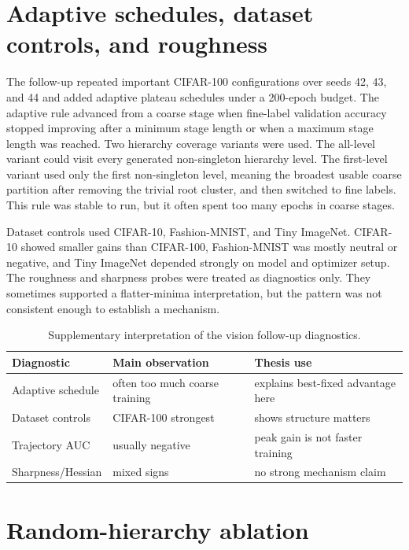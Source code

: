 \section{Adaptive schedules, dataset controls, and roughness}
\label{app:roughness-followup-curriculum}

The follow-up repeated important CIFAR-100 configurations over seeds 42, 43, and
44 and added adaptive plateau schedules under a 200-epoch budget. The adaptive
rule advanced from a coarse stage when fine-label validation accuracy stopped
improving after a minimum stage length or when a maximum stage length was
reached. Two hierarchy
coverage variants were used. The all-level variant could visit every generated
non-singleton hierarchy level. The first-level variant used only the first
non-singleton level, meaning the broadest usable coarse partition after removing
the trivial root cluster, and then switched to fine labels. This rule was stable
to run, but it often spent too many epochs in coarse stages.

Dataset controls used CIFAR-10, Fashion-MNIST, and Tiny ImageNet. CIFAR-10
showed smaller gains than CIFAR-100, Fashion-MNIST was mostly neutral or
negative, and Tiny ImageNet depended strongly on model and optimizer setup. The
roughness and sharpness probes were treated as diagnostics only. They sometimes
supported a flatter-minima interpretation, but the pattern was not consistent
enough to establish a mechanism.

\begin{table}[h]
\centering
\small
\begin{tabular}{lll}
\toprule
Diagnostic & Main observation & Thesis use \\
\midrule
Adaptive schedule & often too much coarse training & explains best-fixed advantage here \\
Dataset controls & CIFAR-100 strongest & shows structure matters \\
Trajectory AUC & usually negative & peak gain is not faster training \\
Sharpness/Hessian & mixed signs & no strong mechanism claim \\
\bottomrule
\end{tabular}
\caption{Supplementary interpretation of the vision follow-up diagnostics.}
\label{tab:app-vision-diagnostic-summary}
\end{table}

\section{Random-hierarchy ablation}
\label{app:hierarchy-ablation-curriculum}

